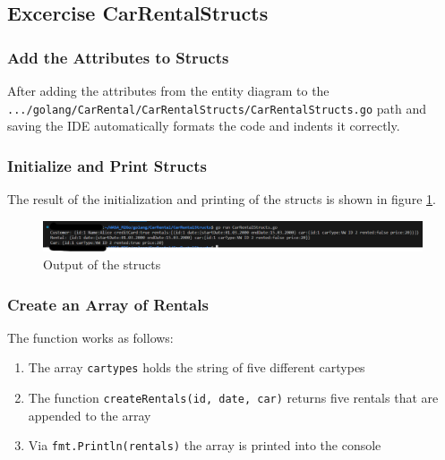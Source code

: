 \subsection{Excercise CarRentalStructs}
\label{sec:car_rental_structs}

\subsubsection*{Add the Attributes to Structs}
After adding the attributes from the entity diagram to the \hfill \newline \texttt{.../golang/CarRental/CarRentalStructs/CarRentalStructs.go} path and saving
the IDE automatically formats the code and indents it correctly.

\subsubsection*{Initialize and Print Structs}
The result of the initialization and printing of the structs is shown in figure \ref{fig:car_rental_structs}.
\begin{figure}[H]
    \centering
    \includegraphics[width=\textwidth]{figures/goLang/carRental/carRental_structs.png}
    \caption{Output of the structs}
    \label{fig:car_rental_structs}
\end{figure}

\subsubsection*{Create an Array of Rentals}
The function works as follows:
\begin{enumerate}
    \item The array \texttt{cartypes} holds the string of five different cartypes
    \item The function \texttt{createRentals(id, date, car)} returns five rentals that are appended to the array
    \item Via \texttt{fmt.Println(rentals)} the array is printed into the console
\end{enumerate}

